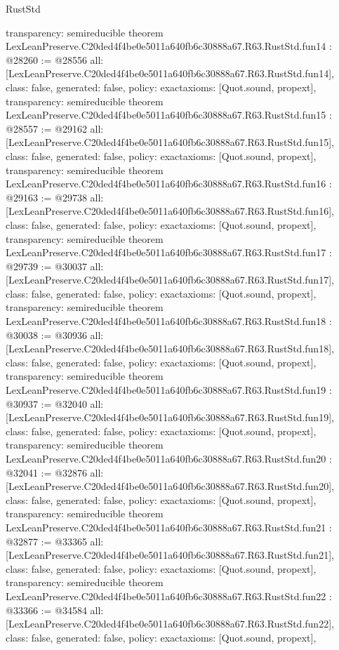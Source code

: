 \begin{lexlean}{RustStd}
\begin{coremodule}
{  transparency: semireducible
}
theorem LexLeanPreserve.C20ded4f4be0e5011a640fb6c30888a67.R63.RustStd.fun14 : @28260 := @28556 {
  all: [LexLeanPreserve.C20ded4f4be0e5011a640fb6c30888a67.R63.RustStd.fun14],
  class: false,
  generated: false,
  policy: exact{axioms: [Quot.sound, propext]},
  transparency: semireducible
}
theorem LexLeanPreserve.C20ded4f4be0e5011a640fb6c30888a67.R63.RustStd.fun15 : @28557 := @29162 {
  all: [LexLeanPreserve.C20ded4f4be0e5011a640fb6c30888a67.R63.RustStd.fun15],
  class: false,
  generated: false,
  policy: exact{axioms: [Quot.sound, propext]},
  transparency: semireducible
}
theorem LexLeanPreserve.C20ded4f4be0e5011a640fb6c30888a67.R63.RustStd.fun16 : @29163 := @29738 {
  all: [LexLeanPreserve.C20ded4f4be0e5011a640fb6c30888a67.R63.RustStd.fun16],
  class: false,
  generated: false,
  policy: exact{axioms: [Quot.sound, propext]},
  transparency: semireducible
}
theorem LexLeanPreserve.C20ded4f4be0e5011a640fb6c30888a67.R63.RustStd.fun17 : @29739 := @30037 {
  all: [LexLeanPreserve.C20ded4f4be0e5011a640fb6c30888a67.R63.RustStd.fun17],
  class: false,
  generated: false,
  policy: exact{axioms: [Quot.sound, propext]},
  transparency: semireducible
}
theorem LexLeanPreserve.C20ded4f4be0e5011a640fb6c30888a67.R63.RustStd.fun18 : @30038 := @30936 {
  all: [LexLeanPreserve.C20ded4f4be0e5011a640fb6c30888a67.R63.RustStd.fun18],
  class: false,
  generated: false,
  policy: exact{axioms: [Quot.sound, propext]},
  transparency: semireducible
}
theorem LexLeanPreserve.C20ded4f4be0e5011a640fb6c30888a67.R63.RustStd.fun19 : @30937 := @32040 {
  all: [LexLeanPreserve.C20ded4f4be0e5011a640fb6c30888a67.R63.RustStd.fun19],
  class: false,
  generated: false,
  policy: exact{axioms: [Quot.sound, propext]},
  transparency: semireducible
}
theorem LexLeanPreserve.C20ded4f4be0e5011a640fb6c30888a67.R63.RustStd.fun20 : @32041 := @32876 {
  all: [LexLeanPreserve.C20ded4f4be0e5011a640fb6c30888a67.R63.RustStd.fun20],
  class: false,
  generated: false,
  policy: exact{axioms: [Quot.sound, propext]},
  transparency: semireducible
}
theorem LexLeanPreserve.C20ded4f4be0e5011a640fb6c30888a67.R63.RustStd.fun21 : @32877 := @33365 {
  all: [LexLeanPreserve.C20ded4f4be0e5011a640fb6c30888a67.R63.RustStd.fun21],
  class: false,
  generated: false,
  policy: exact{axioms: [Quot.sound, propext]},
  transparency: semireducible
}
theorem LexLeanPreserve.C20ded4f4be0e5011a640fb6c30888a67.R63.RustStd.fun22 : @33366 := @34584 {
  all: [LexLeanPreserve.C20ded4f4be0e5011a640fb6c30888a67.R63.RustStd.fun22],
  class: false,
  generated: false,
  policy: exact{axioms: [Quot.sound, propext]},
}
\end{coremodule}
\end{lexlean}
